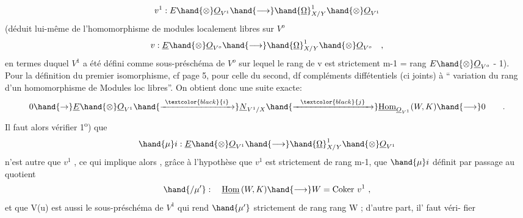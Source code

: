 
\[ v^1 : E\hand{\otimes}\underline{O}_{V^1} \hand{\longrightarrow} \hand{\underline{\Omega}}^1_{X/Y}\hand{\otimes}\underline{O}_{V^1} \]
 (déduit  lui-même de l'homomorphisme de modules
localement libres sur $V^o$
\[ v : \underline{E}\hand{\otimes}\underline{O}_{V^o} \hand{\longrightarrow} \hand{\underline{\Omega}}^1_{X/Y}\hand{\otimes} \underline{O}_{V^o} \quad , \]
en termes duquel  $V^1$ a été défini comme  sous-préschéma de $V^o$ sur lequel
le rang de v est strictement \hand{$\leqslant$} m-1 = rang $E\hand{\otimes}\underline{O}_{V^o}$ - 1). Pour la définition
du premier isomorphisme, cf page 5, pour celle du second, df compléments
diffétentiels (ci joints) à `` variation du rang d'un homomorphisme de
Modules loc libres''. On obtient donc une suite exacte:
\[ 0 \hand{\to} \underline{E}\hand{\otimes}\underline{O}_{V^1} \hand{\xrightarrow{\ \textcolor{black}{i}\ }} \underline{N}_{V^1/X} \hand{\xrightarrow{\ \ \textcolor{black}{j}\ \ }} \underline{\mathrm{Hom}}_{\underline{O}_{V^1}}(W,K) \hand{\longrightarrow} 0 \qquad . \]
Il faut alors vérifier 
1\textsuperscript{o}) que
\[ \hand{\mu}i : \underline{E}\hand{\otimes}\underline{O}_{V^1} \hand{\longrightarrow} \hand{\underline{\Omega}}^1_{X/Y}\hand{\otimes}\underline{O}_{V^1} \]
n'est autre que $v^1$ , ce qui implique alors , grâce à l'hypothèse que
$v^1$ est strictement de rang m-1, que  $\hand{\mu}i$ définit par passage au
quotient
\[ \hand{/\mu'} : \quad \underline{\mathrm{Hom}}\,(W,K) \hand{\longrightarrow} W = \mathrm{Coker}\ v^1 \ , \]
et que V(u) est aussi le sous-préschéma de $V^1$ qui rend $\hand{\mu'}$ strictement
de rang \hand{\unsure{$<|\leqslant$}}rang W  ; d'autre part, il'  faut véri-%
fier

